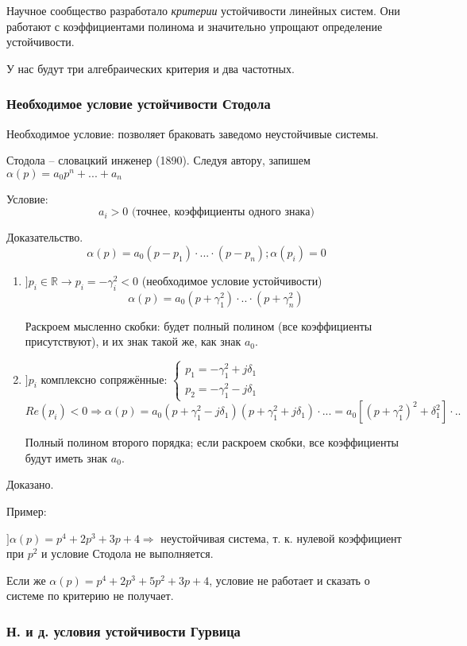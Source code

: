 \documentclass[main.tex]{subfiles}
\begin{document}
Научное сообщество разработало \emph{критерии} устойчивости линейных систем.
Они работают с коэффициентами полинома и значительно упрощают определение устойчивости.

У нас будут три алгебраических критерия и два частотных.

\subsubsection{Необходимое условие устойчивости Стодола}
Необходимое условие: позволяет браковать заведомо неустойчивые системы.

Стодола -- словацкий инженер (1890).
Следуя автору, запишем $\alpha(p) = a_0 p^n + ... + a_n $

Условие:
$$\boxed{a_i > 0} \text{ (точнее, коэффициенты одного знака)}$$

Доказательство.
$$ \alpha(p) = a_0 (p-p_1) \cdot ... \cdot (p - p_n); \alpha(p_i) = 0 $$

\begin{enumerate}[noitemsep]
	\item $ ] p_i \in \mathds{R} \to p_i = - \gamma_i^2 < 0 $ (необходимое условие устойчивости)
	$$ \alpha(p) = a_0(p+\gamma_1^2) \cdot .. \cdot (p + \gamma_n^2) $$

	Раскроем мысленно скобки: будет полный полином (все коэффициенты присутствуют), и их знак такой же, как знак $a_0$.
	\item $ ] p_i$  комплексно сопряжённые: $\begin{cases}
        p_1 = - \gamma_1^2 + j \delta_1 \\
        p_2 = - \gamma_1^2 - j \delta_1
    \end{cases} $
    $$ Re(p_i) < 0 \Rightarrow \alpha(p) = a_0(p + \gamma_1^2 - j \delta_1)(p + \gamma_1^2 + j \delta_1) \cdot ... = a_0 [(p + \gamma_1^2)^2 + \delta_1^2] \cdot .. $$


	Полный полином второго порядка; если раскроем скобки, все коэффициенты будут иметь знак $a_0$.
\end{enumerate}
Доказано.

Пример:

$ ] \alpha(p) = p^4 + 2 p^3 + 3p + 4 \Rightarrow $ неустойчивая система, т. к. нулевой коэффициент при $ p^2 $ и условие Стодола не выполняется.

Если же $ \alpha(p) = p^4 + 2 p^3 + 5 p^2 + 3p + 4 $, условие не работает и сказать о системе по критерию не получает.

\subsubsection{Н. и д. условия устойчивости Гурвица}
\end{document}

